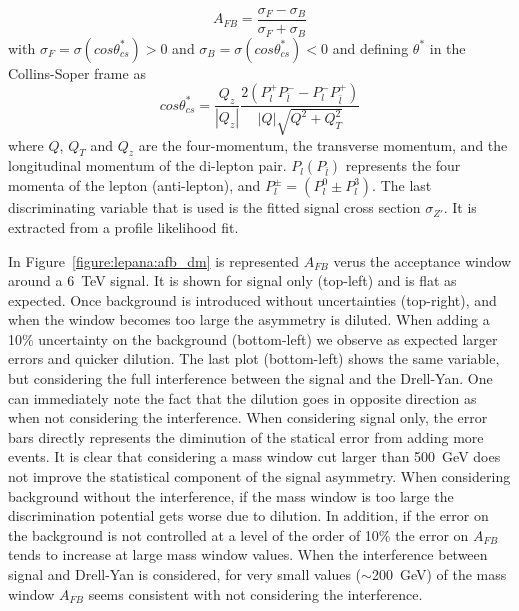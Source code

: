 \begin{equation}
A_{FB} =   \frac{\sigma_F - \sigma_B}{\sigma_F + \sigma_B}
\end{equation}
with $\sigma_F = \sigma (cos\theta^{*}_{cs})>0$ and $\sigma_B = \sigma (cos\theta^{*}_{cs})<0$ and defining $\theta^*$ in the Collins-Soper 
frame as
\begin{equation}
cos\theta^{*}_{cs} =  \frac{Q_z}{|Q_z|} \frac{2(P_l^+P_{\bar{l}}^- - P_l^-P_{\bar{l}}^+)}{|Q| \sqrt{Q^2+Q^2_T}}
\end{equation}
where $Q$, $Q_T$ and $Q_z$ are the four-momentum, the transverse momentum, and the longitudinal
momentum of the di-lepton pair. $P_{l}(P_{\bar{l}})$ represents the four momenta of the lepton (anti-lepton),
and $P^\pm_l = (P^0_l \pm P^3_l)$.
\newline
The last discriminating variable that is used is the fitted signal cross section $\sigma_{Z'}$. It is extracted from a profile likelihood fit.

\label{subsubsection:opti}
In Figure~\ref{figure:lepana:afb_dm} is represented $A_{FB}$ verus the acceptance window around a 6~TeV signal. 
It is shown for signal only (top-left) and is flat as expected. Once background is introduced without uncertainties (top-right), and when the window 
becomes too large the asymmetry is diluted. When adding a 10\% uncertainty on the background (bottom-left) we observe as expected larger errors and quicker dilution.
The last plot (bottom-left) shows the same variable, but considering the full interference between the signal and the Drell-Yan. One can immediately 
note the fact that the dilution goes in opposite direction as when not considering the interference. 
When considering signal only, the error bars directly represents the diminution of the statical error from adding more events. It is clear that considering a mass window cut 
larger than 500~GeV does not improve the statistical component of the signal asymmetry. When considering background without the interference, if the mass window is too large 
the discrimination potential gets worse due to dilution. In addition, if the error on the background is not controlled at a level of the order of 10\% the error on $A_{FB}$ tends to 
increase at large mass window values. When the interference between signal and Drell-Yan is considered, for very small values ($\sim$200~GeV) of the mass window 
$A_{FB}$ seems consistent with not considering the interference. 

